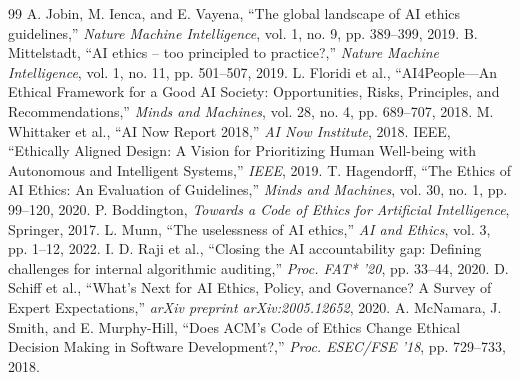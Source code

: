 \documentclass[conference]{IEEEtran}
\begin{document}
\begin{thebibliography}{99}
 A. Jobin, M. Ienca, and E. Vayena, ``The global landscape of AI ethics guidelines,'' \textit{Nature Machine Intelligence}, vol. 1, no. 9, pp. 389--399, 2019.
 B. Mittelstadt, ``AI ethics – too principled to practice?,'' \textit{Nature Machine Intelligence}, vol. 1, no. 11, pp. 501--507, 2019.
 L. Floridi et al., ``AI4People—An Ethical Framework for a Good AI Society: Opportunities, Risks, Principles, and Recommendations,'' \textit{Minds and Machines}, vol. 28, no. 4, pp. 689--707, 2018.
 M. Whittaker et al., ``AI Now Report 2018,'' \textit{AI Now Institute}, 2018.
 IEEE, ``Ethically Aligned Design: A Vision for Prioritizing Human Well-being with Autonomous and Intelligent Systems,'' \textit{IEEE}, 2019.
 T. Hagendorff, ``The Ethics of AI Ethics: An Evaluation of Guidelines,'' \textit{Minds and Machines}, vol. 30, no. 1, pp. 99--120, 2020.
 P. Boddington, \textit{Towards a Code of Ethics for Artificial Intelligence}, Springer, 2017.
 L. Munn, ``The uselessness of AI ethics,'' \textit{AI and Ethics}, vol. 3, pp. 1--12, 2022.
 I. D. Raji et al., ``Closing the AI accountability gap: Defining challenges for internal algorithmic auditing,'' \textit{Proc. FAT* '20}, pp. 33--44, 2020.
 D. Schiff et al., ``What’s Next for AI Ethics, Policy, and Governance? A Survey of Expert Expectations,'' \textit{arXiv preprint arXiv:2005.12652}, 2020.
 A. McNamara, J. Smith, and E. Murphy-Hill, ``Does ACM's Code of Ethics Change Ethical Decision Making in Software Development?,'' \textit{Proc. ESEC/FSE '18}, pp. 729--733, 2018.
\end{thebibliography}
\end{document}
